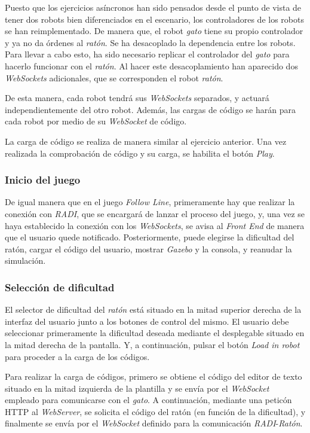 \documentclass[a4paper, 12pt]{book}
\begin{document}
Puesto que los ejercicios asíncronos han sido pensados desde el punto de vista de tener dos robots bien diferenciados en el escenario, los controladores de los robots se han reimplementado. De manera que, el robot \emph{gato} tiene su propio controlador y ya no da órdenes al \emph{ratón}. Se ha desacoplado la dependencia entre los robots. Para llevar a cabo esto, ha sido necesario replicar el controlador del \emph{gato} para hacerlo funcionar con el \emph{ratón}. Al hacer este desacoplamiento han aparecido dos \emph{WebSockets} adicionales, que se corresponden el robot \emph{ratón}. 

De esta manera, cada robot tendrá sus \emph{WebSockets} separados, y actuará independientemente del otro robot. Además, las cargas de código se harán para cada robot por medio de su \emph{WebSocket} de código.

La carga de código se realiza de manera similar al ejercicio anterior. Una vez realizada la comprobación de código y su carga, se habilita el botón \emph{Play}.

\subsubsection{Inicio del juego}
\label{drone_cat_mouse_inicio}

De igual manera que en el juego \emph{Follow Line}, primeramente hay que realizar la conexión con \emph{RADI}, que se encargará de lanzar el proceso del juego, y, una vez se haya establecido la conexión con los \emph{WebSockets}, se avisa al \emph{Front End} de manera que el usuario quede notificado. Posteriormente, puede elegirse la dificultad del ratón, cargar el código del usuario, mostrar \emph{Gazebo} y la consola,  y reanudar la simulación.

\subsubsection{Selección de dificultad}
\label{drone_cat_mouse_difficulty}

El selector de dificultad del \emph{ratón} está situado en la mitad superior derecha de la interfaz del usuario junto a los botones de control del mismo. El usuario debe seleccionar primeramente la dificultad deseada mediante el desplegable situado en la mitad derecha de la pantalla. Y, a continuación, pulsar el botón \emph{Load in robot} para proceder a la carga de los códigos.

Para realizar la carga de códigos, primero se obtiene el código del editor de texto situado en la mitad izquierda de la plantilla y se envía por el \emph{WebSocket} empleado para comunicarse con el \emph{gato}. A continuación, mediante una peticón HTTP al \emph{WebServer}, se solicita el código del ratón (en función de la dificultad), y finalmente se envía por el \emph{WebSocket} definido para la comunicación  \emph{RADI}-\emph{Ratón}.
\end{document}
